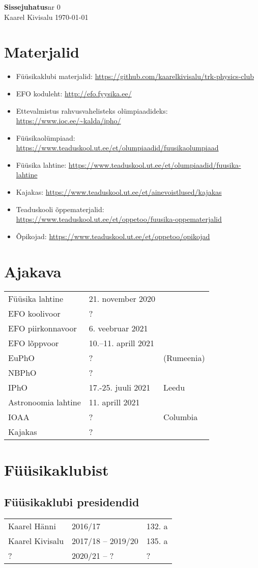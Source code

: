 \documentclass[a4paper,11pt,twocolumn]{article}
\begin{document}
{\huge \textbf{Sissejuhatus}\hfill \normalsize {nr 0}} \\
{Kaarel Kivisalu \hfill \today}

\section{Materjalid}

\begin{itemize}
\item Füüsikaklubi materjalid: \url{https://github.com/kaarelkivisalu/trk-physics-club}
\item EFO koduleht: \url{http://efo.fyysika.ee/}
\item Ettevalmistus rahvusvahelisteks olümpiaadideks: \url{https://www.ioc.ee/~kalda/ipho/}
\item Füüsikaolümpiaad: \url{https://www.teaduskool.ut.ee/et/olumpiaadid/fuusikaolumpiaad}
\item Füüsika lahtine: \url{https://www.teaduskool.ut.ee/et/olumpiaadid/fuusika-lahtine}
\item Kajakas: \url{https://www.teaduskool.ut.ee/et/ainevoistlused/kajakas}
\item Teaduskooli õppematerjalid: \url{https://www.teaduskool.ut.ee/et/oppetoo/fuusika-oppematerjalid}
\item Õpikojad: \url{https://www.teaduskool.ut.ee/et/oppetoo/opikojad}
\end{itemize}

\section{Ajakava}

\begin{tabular}{l l l}
    Füüsika lahtine & 21. november 2020 \\
    EFO koolivoor & ? \\
    EFO piirkonnavoor & 6. veebruar 2021 \\
    EFO lõppvoor & 10.--11. aprill 2021 \\
    EuPhO & ? & (Rumeenia)\\
    NBPhO & ?\\
    IPhO & 17.-25. juuli 2021 & Leedu\\
    Astronoomia lahtine & 11. aprill 2021 \\
    IOAA & ? & Columbia\\
    Kajakas & ? \\
\end{tabular}

\section{Füüsikaklubist}

\subsection{Füüsikaklubi presidendid}
\begin{tabular}{l l l}
    Kaarel Hänni & 2016/17 & 132. a \\
    Kaarel Kivisalu & 2017/18 -- 2019/20 & 135. a \\
    ? & 2020/21 -- ? & ? \\
\end{tabular}
\end{document}
